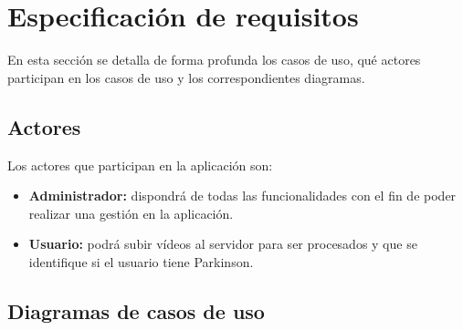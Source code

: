 \section{Especificación de requisitos}
En esta sección se detalla de forma profunda los casos de uso, qué actores participan en los casos de uso y los correspondientes diagramas.

\subsection{Actores}
Los actores que participan en la aplicación son:

\begin{itemize}
	\item \textbf{Administrador:} dispondrá de todas las funcionalidades con el fin de poder realizar una gestión en la aplicación.
	\item \textbf{Usuario:} podrá subir vídeos al servidor para ser procesados y que se identifique si el usuario tiene Parkinson.
\end{itemize}

\subsection{Diagramas de casos de uso}
